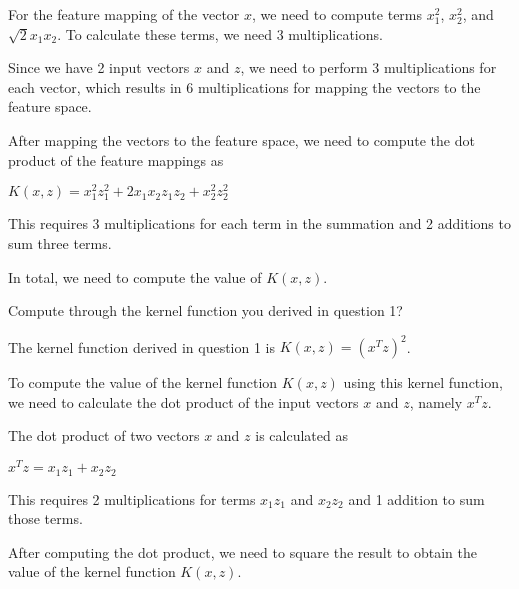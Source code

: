 \documentclass[12pt,letterpaper, onecolumn]{exam}
\begin{document}
\begin{questions}
\begin{parts}
\begin{subparts}
\begin{solution}
                For the feature mapping of the vector $x$, we need to compute terms $x_1^2$, $x_2^2$, and $\sqrt{2}x_1x_2$.
                To calculate these terms, we need 3 multiplications.

                Since we have 2 input vectors $x$ and $z$, we need to perform 3 multiplications for each vector, which results in 6 multiplications
                for mapping the vectors to the feature space.

                After mapping the vectors to the feature space, we need to compute the dot product of the feature mappings as

                \begin{center}
                    $K(x, z) = x_1^2z_1^2 + 2x_1x_2z_1z_2 + x_2^2z_2^2$
                \end{center}

                This requires 3 multiplications for each term in the summation and 2 additions to sum three terms. 
                
                In total, we need  to compute the value of $K(x, z)$.

            \end{solution}

            \pagebreak

            \subpart[10] Compute through the kernel function you derived in question 1?

            \begin{solution}

                The kernel function derived in question 1 is $K(x, z) = (x^Tz)^2$.

                To compute the value of the kernel function $K(x, z)$ using this kernel function, we need to calculate the dot product of the input vectors $x$ and $z$,
                namely $x^Tz$.

                The dot product of two vectors $x$ and $z$ is calculated as

                \begin{center}
                    $x^Tz = x_1z_1 + x_2z_2$
                \end{center}

                This requires 2 multiplications for terms $x_1z_1$ and $x_2z_2$ and 1 addition to sum those terms.

                After computing the dot product, we need to square the result to obtain the value of the kernel function $K(x, z)$.


\end{solution}
\end{subparts}
\end{parts}
\end{questions}
\end{document}
